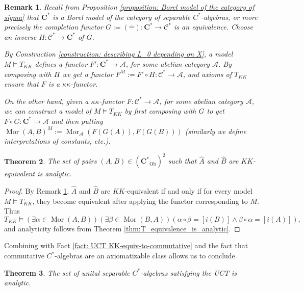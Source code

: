 \documentclass[12pt]{amsart}
\newtheorem{theorem}{Theorem}[section]
\newtheorem{remark}[theorem]{Remark}
\DeclareMathOperator{\Mor}{Mor}
\DeclareMathOperator{\Ob}{Ob}
\newcommand{\Cstar}{\mathbf{C^*}} %
\begin{document}
\begin{remark} \label{remark:models are functors description}
    Recall from Proposition \ref{proposition: Borel model of the category of sigma} that $\Cstar$ is a Borel model of the category of separable $C^*$-algebras, or more precisely the completion functor $G := (\widehat{-}) \colon \Cstar \to \mathcal{C}^*$ is an equivalence. 
    Choose an inverse $H \colon \mathcal{C}^* \to \Cstar$ of $G$.

    By Construction \ref{construction: describing L_0 depending on X}, a model $M \models T_{KK}$ defines a functor $F' \colon \Cstar \to \mathcal{A}$, for some abelian category $\mathcal{A}$. 
    By composing with $H$ we get a functor $F^M := F' \circ H \colon \mathcal{C}^* \to \mathcal{A}$, and axioms of $T_{KK}$ ensure that $F$ is a $\kappa\kappa$-functor. 
    
    On the other hand, given a $\kappa\kappa$-functor $F \colon \mathcal{C}^* \to \mathcal{A}$, for some abelian category $\mathcal{A}$, we can construct a model of $M \models T_{KK}$ by first composing with $G$ to get $F \circ G \colon \Cstar \to \mathcal{A}$ and then putting $\Mor(A,B)^M := \Mor_{\mathcal{A}}(F(G(A)),F(G(B)))$ (similarly we define interpretations of constants, etc.). 
\end{remark}


\begin{theorem}
    The set of pairs $(A, B)\in (\Cstar_{\Ob})^2$ such that $\widehat{A}$ and $\widehat{B}$ are $KK$-equivalent is analytic.
\end{theorem}
\begin{proof}
    By Remark \ref{remark:models are functors description}, $\widehat{A}$ and $\widehat{B}$ are $KK$-equivalent if and only if for every model $M \models T_{KK}$, they become equivalent after applying the functor corresponding to $M$. 
    Thus
    \[ T_{KK} \models (\exists \alpha \in \Mor(A, B))(\exists \beta \in \Mor(B, A))( \alpha \circ \beta = [i(B)] \wedge \beta \circ \alpha = [i(A)] ), \]
    and analyticity follows from Theorem \ref{thm:T_equivalence_is_analytic}. 
\end{proof}

Combining with Fact \ref{fact: UCT KK-equiv-to-commutative} and the fact that commutative $C^*$-algebras are an axiomatizable class allows us to conclude.

\begin{theorem}
    The set of unital separable $C^*$-algebras satisfying the UCT is analytic.
\end{theorem}
\end{document}
